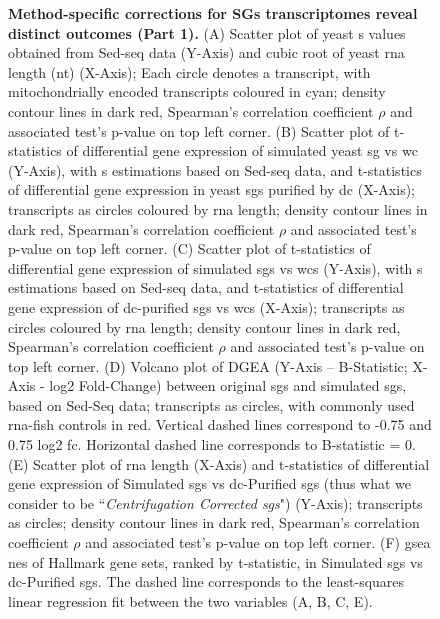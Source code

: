 \begin{figure}[t]
	\captionsetup{labelformat=adja-page}
	\ContinuedFloat
	\caption[]{\textbf{Method-specific corrections for SGs transcriptomes reveal distinct outcomes (Part 1).}
		(A) Scatter plot of yeast \gls{s} values obtained from Sed-seq data\cite{glauninger_transcriptome-wide_2025} (Y-Axis) and cubic root of yeast \gls{rna} length (\gls{nt}) (X-Axis); Each circle denotes a transcript, with mitochondrially encoded transcripts coloured in cyan; density contour lines in dark red, Spearman's correlation coefficient $\rho$ and associated test's p-value on top left corner. (B) Scatter plot of t-statistics of differential gene expression of simulated yeast \gls{sg} \gls{vs} \gls{wc} (Y-Axis), with \gls{s} estimations based on Sed-seq data\cite{glauninger_transcriptome-wide_2025}, and t-statistics of differential gene expression in yeast \glspl{sg} purified by \gls{dc}\cite{khong_stress_2017} (X-Axis); transcripts as circles coloured by \gls{rna} length; density contour lines in dark red, Spearman's correlation coefficient $\rho$ and associated test's p-value on top left corner. (C) Scatter plot of t-statistics of differential gene expression of simulated \glspl{sg} \gls{vs} \glspl{wc} (Y-Axis), with \gls{s} estimations based on Sed-seq data\cite{glauninger_transcriptome-wide_2025}, and t-statistics of differential gene expression of \gls{dc}-purified \glspl{sg} \gls{vs} \glspl{wc}\cite{khong_stress_2017} (X-Axis); transcripts as circles coloured by \gls{rna} length; density contour lines in dark red, Spearman's correlation coefficient $\rho$ and associated test's p-value on top left corner. (D) Volcano plot of DGEA (Y-Axis – B-Statistic; X-Axis - log2 Fold-Change) between original \glspl{sg}\cite{khong_stress_2017} and simulated \glspl{sg}, based on Sed-Seq data\cite{glauninger_transcriptome-wide_2025}; transcripts as circles, with commonly used \gls{rna}-\gls{fish} controls\cite{khong_stress_2017} in red. Vertical dashed lines correspond to -0.75 and 0.75 log2 \gls{fc}. Horizontal dashed line corresponds to B-statistic = 0. (E) Scatter plot of \gls{rna} length (X-Axis) and  t-statistics of differential gene expression of Simulated \glspl{sg} \gls{vs} \gls{dc}-Purified \glspl{sg}\cite{khong_stress_2017} (thus what we consider to be “\textit{Centrifugation Corrected \glspl{sg}}") (Y-Axis); transcripts as circles; density contour lines in dark red, Spearman's correlation coefficient $\rho$ and associated test's p-value on top left corner. (F) \gls{gsea} \gls{nes} of Hallmark gene sets, ranked by t-statistic, in Simulated \glspl{sg} \gls{vs} \gls{dc}-Purified \glspl{sg}\cite{khong_stress_2017}. The dashed line corresponds to the least-squares linear regression fit between the two variables (A, B, C, E).}
\end{figure}
